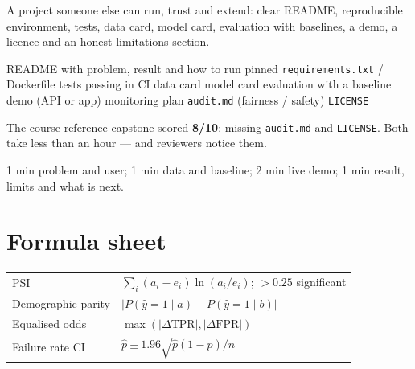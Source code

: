 \documentclass[11pt,a4paper]{article}
\begin{document}
\begin{bdef}
A project someone else can run, trust and extend: clear README, reproducible environment, tests, data card, model card, evaluation with baselines, a demo, a licence and an honest limitations section.
\end{bdef}
\begin{balgo}
\begin{algorithmic}[1]
\State README with problem, result and how to run \quad \State pinned \texttt{requirements.txt} / Dockerfile
\State tests passing in CI \quad \State data card \quad \State model card
\State evaluation with a baseline \quad \State demo (API or app) \quad \State monitoring plan
\State \texttt{audit.md} (fairness / safety) \quad \State \texttt{LICENSE}
\end{algorithmic}
\end{balgo}
\begin{bres}
The course reference capstone scored \textbf{8/10}: missing \texttt{audit.md} and \texttt{LICENSE}. Both take less than an hour --- and reviewers notice them.
\end{bres}
\begin{bex}
1 min problem and user; 1 min data and baseline; 2 min live demo; 1 min result, limits and what is next.
\end{bex}

\section*{Formula sheet}
\begin{tabularx}{\linewidth}{@{}l X@{}}
\toprule
PSI & $\sum_i(a_i-e_i)\ln(a_i/e_i)$; \; $>0.25$ significant\\
Demographic parity & $|P(\hat y{=}1\mid a)-P(\hat y{=}1\mid b)|$\\
Equalised odds & $\max(|\Delta\mathrm{TPR}|,|\Delta\mathrm{FPR}|)$\\
Failure rate CI & $\hat p\pm1.96\sqrt{\hat p(1-\hat p)/n}$\\
\bottomrule
\end{tabularx}
\end{document}
